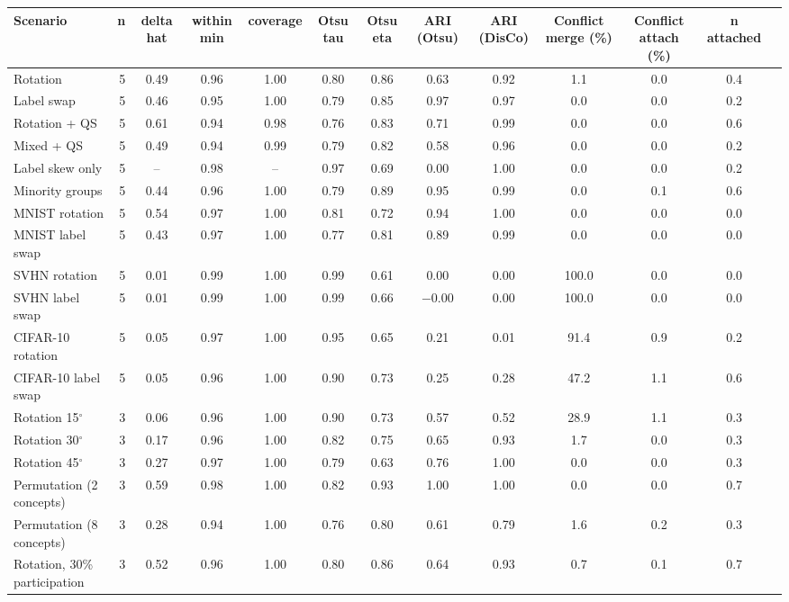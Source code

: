 {\scriptsize
\begin{tabular}{l r c c c c c c c c c c c}
\toprule
Scenario & n & delta hat & within min & coverage & Otsu tau & Otsu eta & ARI (Otsu) & ARI (DisCo) & Conflict merge (\%) & Conflict attach (\%) & n attached \\
\midrule
Rotation & 5 & 0.49 & 0.96 & 1.00 & 0.80 & 0.86 & 0.63 & 0.92 & 1.1 & 0.0 & 0.4 \\
Label swap & 5 & 0.46 & 0.95 & 1.00 & 0.79 & 0.85 & 0.97 & 0.97 & 0.0 & 0.0 & 0.2 \\
Rotation + QS & 5 & 0.61 & 0.94 & 0.98 & 0.76 & 0.83 & 0.71 & 0.99 & 0.0 & 0.0 & 0.6 \\
Mixed + QS & 5 & 0.49 & 0.94 & 0.99 & 0.79 & 0.82 & 0.58 & 0.96 & 0.0 & 0.0 & 0.2 \\
Label skew only & 5 & -- & 0.98 & -- & 0.97 & 0.69 & 0.00 & 1.00 & 0.0 & 0.0 & 0.2 \\
Minority groups & 5 & 0.44 & 0.96 & 1.00 & 0.79 & 0.89 & 0.95 & 0.99 & 0.0 & 0.1 & 0.6 \\
MNIST rotation & 5 & 0.54 & 0.97 & 1.00 & 0.81 & 0.72 & 0.94 & 1.00 & 0.0 & 0.0 & 0.0 \\
MNIST label swap & 5 & 0.43 & 0.97 & 1.00 & 0.77 & 0.81 & 0.89 & 0.99 & 0.0 & 0.0 & 0.0 \\
SVHN rotation & 5 & 0.01 & 0.99 & 1.00 & 0.99 & 0.61 & 0.00 & 0.00 & 100.0 & 0.0 & 0.0 \\
SVHN label swap & 5 & 0.01 & 0.99 & 1.00 & 0.99 & 0.66 & $-$0.00 & 0.00 & 100.0 & 0.0 & 0.0 \\
CIFAR-10 rotation & 5 & 0.05 & 0.97 & 1.00 & 0.95 & 0.65 & 0.21 & 0.01 & 91.4 & 0.9 & 0.2 \\
CIFAR-10 label swap & 5 & 0.05 & 0.96 & 1.00 & 0.90 & 0.73 & 0.25 & 0.28 & 47.2 & 1.1 & 0.6 \\
Rotation 15$^\circ$ & 3 & 0.06 & 0.96 & 1.00 & 0.90 & 0.73 & 0.57 & 0.52 & 28.9 & 1.1 & 0.3 \\
Rotation 30$^\circ$ & 3 & 0.17 & 0.96 & 1.00 & 0.82 & 0.75 & 0.65 & 0.93 & 1.7 & 0.0 & 0.3 \\
Rotation 45$^\circ$ & 3 & 0.27 & 0.97 & 1.00 & 0.79 & 0.63 & 0.76 & 1.00 & 0.0 & 0.0 & 0.3 \\
Permutation (2 concepts) & 3 & 0.59 & 0.98 & 1.00 & 0.82 & 0.93 & 1.00 & 1.00 & 0.0 & 0.0 & 0.7 \\
Permutation (8 concepts) & 3 & 0.28 & 0.94 & 1.00 & 0.76 & 0.80 & 0.61 & 0.79 & 1.6 & 0.2 & 0.3 \\
Rotation, 30\% participation & 3 & 0.52 & 0.96 & 1.00 & 0.80 & 0.86 & 0.64 & 0.93 & 0.7 & 0.1 & 0.7 \\

\end{tabular}}

